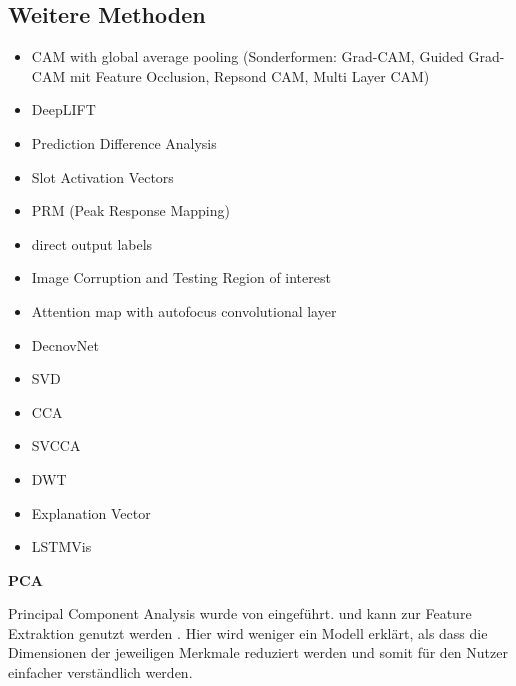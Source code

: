 \subsection{Weitere Methoden}
\begin{itemize}
    \item CAM with global average pooling (Sonderformen: Grad-CAM, Guided Grad-CAM mit Feature Occlusion, Repsond CAM, Multi Layer CAM)
    \item DeepLIFT
    \item Prediction Difference Analysis 
    \item Slot Activation Vectors
    \item PRM (Peak Response Mapping)
    \item direct output labels
    \item Image Corruption and Testing Region of interest
    \item Attention map with autofocus convolutional layer
    \item DecnovNet
    \item SVD
    \item CCA
    \item SVCCA
    \item DWT
    \item Explanation Vector
    \item LSTMVis
\end{itemize}

\textbf{PCA}
\begin{addmargin}[25pt]{0pt}
Principal Component Analysis wurde von \cite{pearson1901liii} eingeführt. und kann zur Feature Extraktion genutzt werden \cite{tjoa2020survey}. Hier wird weniger ein Modell erklärt, als dass die Dimensionen der jeweiligen Merkmale reduziert werden und somit für den Nutzer einfacher verständlich werden. %
\end{addmargin}
